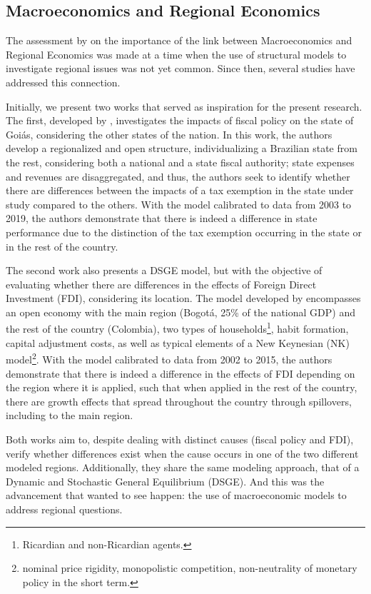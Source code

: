 \documentclass[../thesis.tex]{subfiles}
\begin{document}
	\subsection*{Macroeconomics and Regional Economics}
	
	The assessment by \textcite{rickman_modern_2010} on the importance of the link between Macroeconomics and Regional Economics was made at a time when the use of structural models to investigate regional issues was not yet common. Since then, several studies have addressed this connection.
	
	Initially, we present two works that served as inspiration for the present research. The first, developed by \textcite{costa_junior_dsge_2022}, investigates the impacts of fiscal policy on the state of Goiás, considering the other states of the nation. In this work, the authors develop a regionalized and open structure, individualizing a Brazilian state from the rest, considering both a national and a state fiscal authority; state expenses and revenues are disaggregated, and thus, the authors seek to identify whether there are differences between the impacts of a tax exemption in the state under study compared to the others. With the model calibrated to data from 2003 to 2019, the authors demonstrate that there is indeed a difference in state performance due to the distinction of the tax exemption occurring in the state or in the rest of the country.
	
	The second work also presents a DSGE model, but with the objective of evaluating whether there are differences in the effects of Foreign Direct Investment (FDI), considering its location. The model developed by \textcite{mora_fdi_2019} encompasses an open economy with the main region (Bogotá, 25\% of the national GDP) and the rest of the country (Colombia), two types of households\footnote{ Ricardian and non-Ricardian agents.}, habit formation, capital adjustment costs, as well as typical elements of a New Keynesian (NK) model\footnote{ nominal price rigidity, monopolistic competition, non-neutrality of monetary policy in the short term.}. With the model calibrated to data from 2002 to 2015, the authors demonstrate that there is indeed a difference in the effects of FDI depending on the region where it is applied, such that when applied in the rest of the country, there are growth effects that spread throughout the country through spillovers, including to the main region.
	
	Both works aim to, despite dealing with distinct causes (fiscal policy and FDI), verify whether differences exist when the cause occurs in one of the two different modeled regions. Additionally, they share the same modeling approach, that of a Dynamic and Stochastic General Equilibrium (DSGE). And this was the advancement that \textcite{rickman_modern_2010} wanted to see happen: the use of macroeconomic models to address regional questions.
\end{document}
